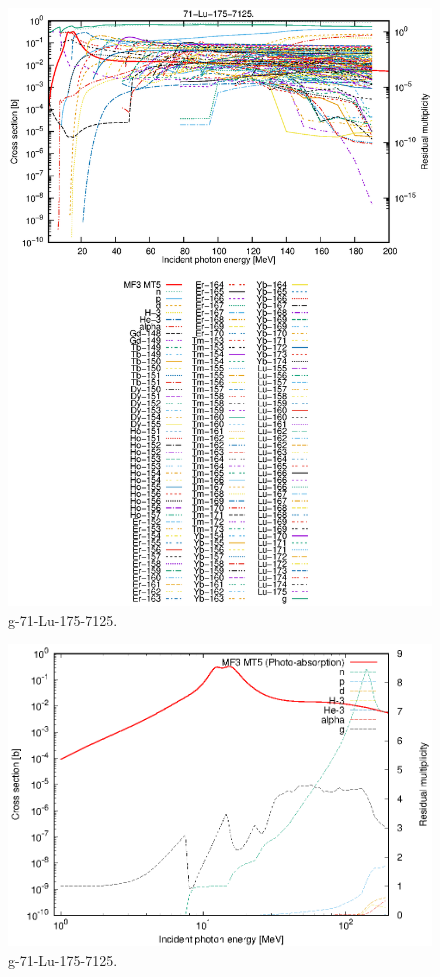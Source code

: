 \begin{figure}
 \includegraphics[width=\linewidth]{eps/g_71-Lu-175_7125.eps}
  \caption{g-71-Lu-175-7125.}
\end{figure}
\newpage \clearpage

\begin{figure}
 \includegraphics[width=\linewidth]{eps-log/g_71-Lu-175_7125.eps}
 \caption{g-71-Lu-175-7125.}
\end{figure}
\newpage \clearpage

